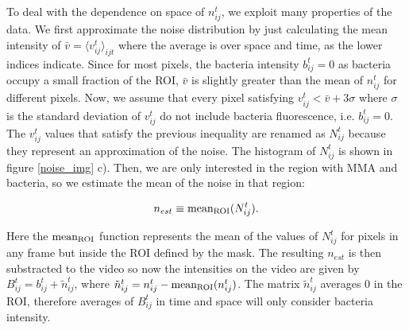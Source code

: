 To deal with the dependence on space of $n_{ij}^t$, we exploit many properties of the data. We first approximate the noise distribution by just calculating the mean intensity of  $\bar{v} = \langle v_{ij}^t \rangle_{ijt}$ where the average is over space and time, as the lower indices indicate. Since for most pixels, the bacteria intensity $b_{ij}^t=0$ as bacteria occupy a small fraction of the ROI, $\bar{v}$ is slightly greater than the mean of $n_{ij}^t$ for different pixels. Now, we assume that every pixel satisfying $v_{ij}^t  < \bar{v} + 3 \sigma$ where $\sigma$ is the standard deviation of $v_{ij}^t$ do not include bacteria fluorescence, i.e. $b_{ij}^t =0$. The $v_{ij}^t$ values that satisfy the previous inequality are renamed as $N_{ij}^t$ because they represent an approximation of the noise. The histogram of $N_{ij}^t$ is shown in figure \ref{noise_img} c). Then, we are only interested in the region with MMA and bacteria, so we estimate the mean of the noise in that region:

\begin{equation} \label{eq:noise_aproximation}
	n_{est} \equiv {\rm mean_{ROI}}(N_{ij}^t).
\end{equation}


Here the ${\rm mean_{ROI}}$ function represents the mean of the values of $N_{ij}^t$ for pixels in any frame but inside the ROI defined by the mask. The resulting $n_{est}$ is then substracted to the video so now the intensities on the video are given by $B_{ij}^t  = b_{ij}^t + \tilde{n}_{ij}^t$, where $\tilde{n}_{ij}^t  = n_{ij}^t - {\rm mean_{ROI}}(n_{ij}^t)$. The matrix $\tilde{n}_{ij}^t$ averages 0 in the ROI, therefore averages of $B_{ij}^t$ in time and space will only consider bacteria intensity.


